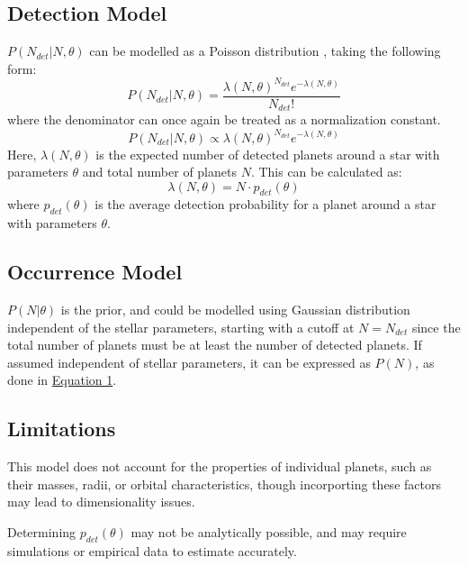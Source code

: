 \documentclass[preprint]{aastex631}
\begin{document}
\subsection{Detection Model}

$P(N_{det} | N,\theta)$ can be modelled as a Poisson distribution \citep{burkeTERRESTRIALPLANETOCCURRENCE2015,youdinEXOPLANETCENSUSGENERAL2011}, taking the following form:
\begin{equation}
  P(N_{det} | N,\theta) = \frac{\lambda(N,\theta)^{N_{det}} e^{-\lambda(N,\theta)}}{N_{det}!}
\end{equation}
where the denominator can once again be treated as a normalization constant.
\begin{equation}
  P(N_{det} | N,\theta) \propto \lambda(N,\theta)^{N_{det}} e^{-\lambda(N,\theta)}
\end{equation}
Here, $\lambda(N,\theta)$ is the expected number of detected planets around a star with parameters $\theta$ and total number of planets $N$. This can be calculated as:
\begin{equation}
  \lambda(N,\theta) = N \cdot p_{det}(\theta)
\end{equation}
where $p_{det}(\theta)$ is the average detection probability for a planet around a star with parameters $\theta$.

\subsection{Occurrence Model}

$P(N | \theta)$ is the prior, and could be modelled using Gaussian distribution independent of the stellar parameters, starting with a cutoff at $N=N_{det}$ since the total number of planets must be at least the number of detected planets. If assumed independent of stellar parameters, it can be expressed as $P(N)$, as done in \hyperref[eq1]{Equation 1}.

\subsection{Limitations}

This model does not account for the properties of individual planets, such as their masses, radii, or orbital characteristics, though incorporting these factors may lead to dimensionality issues.

Determining $p_{det}(\theta)$ may not be analytically possible, and may require simulations or empirical data to estimate accurately.
\end{document}
